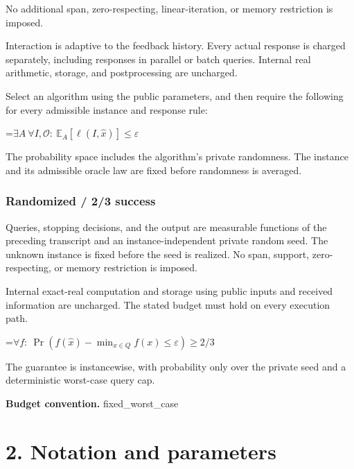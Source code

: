 \documentclass[10pt,a4paper]{article}
\newcommand{\AtlasMath}[1]{\par\begingroup\centering\setbox0=\hbox{$\displaystyle #1$}\ifdim\wd0>1.4\linewidth\typeout{ATLAS WIDE FORMULA: \the\wd0}\fi\ifdim\wd0>\linewidth\resizebox{\linewidth}{!}{\box0}\else\box0\fi\par\endgroup}
\begin{document}
No additional span, zero-respecting, linear-iteration, or memory restriction is imposed.



Interaction is adaptive to the feedback history. Every actual response is charged separately, including responses in parallel or batch queries. Internal real arithmetic, storage, and postprocessing are uncharged.



Select an algorithm using the public parameters, and then require the following for every admissible instance and response rule:




\AtlasMath{\exists A\ \forall I,\mathcal{O}:\ \mathbb{E}_A[\ell(I,\widehat{x})]\le\varepsilon}




The probability space includes the algorithm's private randomness. The instance and its admissible oracle law are fixed before randomness is averaged.



\subsubsection{Randomized / 2/3 success}


Queries, stopping decisions, and the output are measurable functions of the preceding transcript and an instance-independent private random seed. The unknown instance is fixed before the seed is realized. No span, support, zero-respecting, or memory restriction is imposed.



Internal exact-real computation and storage using public inputs and received information are uncharged. The stated budget must hold on every execution path.




\AtlasMath{\forall f:\ \Pr(f(\widehat x)-\min_{x\in Q}f(x)\le\varepsilon)\ge2/3}




The guarantee is instancewise, with probability only over the private seed and a deterministic worst-case query cap.



\textbf{Budget convention.} fixed\_worst\_case



\section{2. Notation and parameters}
\end{document}
